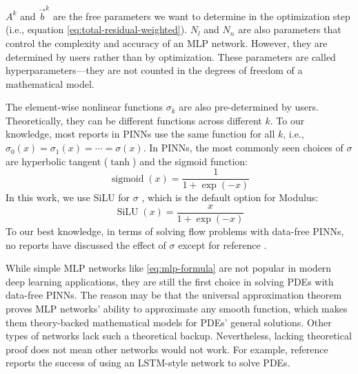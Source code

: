 $A^k$ and $\vec{b}^k$ are the free parameters we want to determine in the optimization step (i.e., equation \eqref{eq:total-residual-weighted}).
$N_l$ and $N_n$ are also parameters that control the complexity and accuracy of an MLP network.
However, they are determined by users rather than by optimization.
These parameters are called hyperparameters---they are not counted in the degrees of freedom of a mathematical model.

The element-wise nonlinear functions $\sigma_{k}$ are also pre-determined by users.
Theoretically, they can be different functions across different $k$.
To our knowledge, most reports in PINNs use the same function for all $k$, i.e., $\sigma_0(x)=\sigma_1(x)=\cdots=\sigma(x)$.
In PINNs, the most commonly seen choices of $\sigma$ are hyperbolic tangent ($\tanh$) and the sigmoid function:
\begin{equation}
    \operatorname{sigmoid}(x) = \frac{1}{1+\exp(-x)}
\end{equation}
In this work, we use SiLU for $\sigma$ \cite{hendrycks_gaussian_2020}, which is the default option for Modulus:
\begin{equation}\label{eq:silu}
    \operatorname{SiLU}(x) = \frac{x}{1+\exp(-x)}
\end{equation}
To our best knowledge, in terms of solving flow problems with data-free PINNs, no reports have discussed the effect of $\sigma$ except for reference \cite{li_integration_2010}.

While simple MLP networks like \eqref{eq:mlp-formula} are not popular in modern deep learning applications, they are still the first choice in solving PDEs with data-free PINNs.
The reason may be that the universal approximation theorem proves MLP networks' ability to approximate any smooth function, which makes them theory-backed mathematical models for PDEs' general solutions.
Other types of networks lack such a theoretical backup.
Nevertheless, lacking theoretical proof does not mean other networks would not work.
For example, reference \cite{sirignano_dgm:_2018} reports the success of using an LSTM-style network to solve PDEs.

